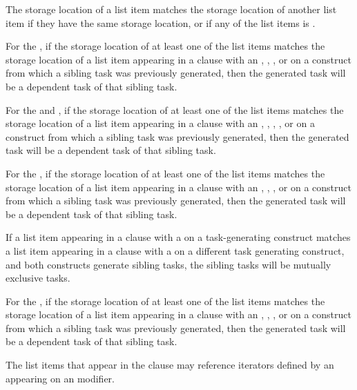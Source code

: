 The storage location of a list item matches the storage location of another
list item if they have the same storage location, or if any of the list items is
.

For the  , if the storage location of at least one
of the list items matches the storage location of a list item appearing
in a  clause with an , , , or 
 on a construct from which a sibling task was previously 
generated, then the generated task will be a dependent task of that sibling task.

For the  and  , if the storage 
location of at least one of the list items matches the storage location 
of a list item appearing in a  clause with an , , 
, , or   on a construct from 
which a sibling task was previously generated, then the generated task will be 
a dependent task of that sibling task.

For the  , if the storage location of 
at least one of the list items matches the storage location of a list 
item appearing in a  clause with an , , , or 
 on a construct from which a sibling task 
was previously generated, then the generated task will be a dependent task 
of that sibling task.

If a list item appearing in a  clause with a 
 on a task-generating construct matches
a list item appearing in a  clause with a 
 on a different task generating construct, and both constructs
generate sibling tasks, the sibling tasks will be mutually exclusive tasks.

For the  , if the storage location of
at least one of the list items matches the storage location of a list
item appearing in a  clause with an , , , or 
 on a construct from which a sibling task
was previously generated, then the generated task will be a dependent task
of that sibling task.

The list items that appear in the  clause may reference iterators
defined by an  appearing on an  modifier.

